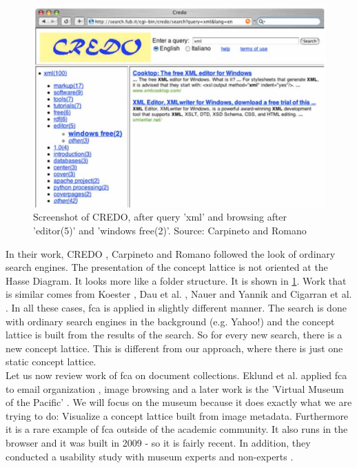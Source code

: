 \documentclass[11pt]{report}
\begin{document}
\begin{figure}[!ht]
	\centering
	\includegraphics[width=\linewidth]{images/credo}
\caption{Screenshot of CREDO, after query 'xml' and browsing after 'editor(5)' and 'windows free(2)'. Source: Carpineto and Romano \cite{Carpineto2004} }
\label{figure:credo}
\end{figure}

In their work, CREDO \cite{Carpineto2004}, Carpineto and Romano followed the look of ordinary search engines. The presentation of the concept lattice is not oriented at the Hasse Diagram. It looks more like a folder structure. It is shown in \ref{figure:credo}. Work that is similar comes from Koester \cite{Koester2006}, Dau et al. \cite{Dau2008}, Nauer and Yannik \cite{Nauer2009} and Cigarran et al. \cite{Cigarran2004}. In all these cases, \acrshort{fca} is applied in slightly different manner. The search is done with ordinary search engines in the background (e.g. Yahoo!) and the concept lattice is built from the results of the search. So for every new search, there is a new concept lattice. This is different from our approach, where there is just one static concept lattice. \\

Let us now review work of \acrshort{fca} on document collections. Eklund et al. applied \acrshort{fca} to email organization \cite{Eklund2004}, image browsing \cite{Ducrou2006,Ducrou2008} and a later work is the 'Virtual Museum of the Pacific' \cite{Eklund2009,Eklund2012}. We will focus on the museum because it does exactly what we are trying to do: Visualize a concept lattice built from image metadata. Furthermore it is a rare example of \acrshort{fca} outside of the academic community. It also runs in the browser and it was built in 2009 - so it is fairly recent. In addition, they conducted a usability study with museum experts and non-experts \cite{Eklund2012}.
\end{document}
